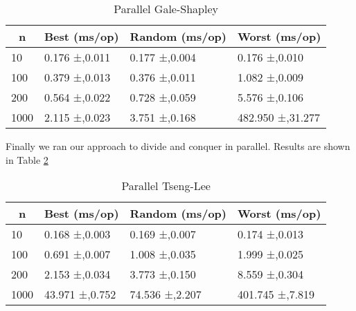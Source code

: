 \begin{table}[h]
    \centering
\begin{tabular}{|l|l|l|l|}
\hline
\multicolumn{1}{|c|}{\textbf{n}} & \multicolumn{1}{c|}{\textbf{Best (ms/op)}} & \multicolumn{1}{c|}{\textbf{Random (ms/op)}} & \multicolumn{1}{c|}{\textbf{Worst (ms/op)}} \\ \hline
10                               & 0.176 ±,0.011                              & 0.177 ±,0.004                                & 0.176 ±,0.010                               \\ \hline
100                              & 0.379 ±,0.013                              & 0.376 ±,0.011                                & 1.082 ±,0.009                               \\ \hline
200                              & 0.564 ±,0.022                              & 0.728 ±,0.059                                & 5.576 ±,0.106                               \\ \hline
1000                             & 2.115 ±,0.023                              & 3.751 ±,0.168                                & 482.950 ±,31.277                            \\ \hline
\end{tabular}
    \caption{Parallel Gale-Shapley}
    \label{tab:parallel-gale-shapley}
\end{table}

Finally we ran our approach to divide and conquer in parallel. Results are shown in Table \ref{tab:parallel-tseng-lee}

\begin{table}[h]
    \centering
\begin{tabular}{|l|l|l|l|}
\hline
\multicolumn{1}{|c|}{\textbf{n}} & \multicolumn{1}{c|}{\textbf{Best (ms/op)}} & \multicolumn{1}{c|}{\textbf{Random (ms/op)}} & \multicolumn{1}{c|}{\textbf{Worst (ms/op)}} \\ \hline
10                               & 0.168 ±,0.003                              & 0.169 ±,0.007                                & 0.174 ±,0.013                               \\ \hline
100                              & 0.691 ±,0.007                              & 1.008 ±,0.035                                & 1.999 ±,0.025                               \\ \hline
200                              & 2.153 ±,0.034                              & 3.773 ±,0.150                                & 8.559 ±,0.304                               \\ \hline
1000                             & 43.971 ±,0.752                             & 74.536 ±,2.207                               & 401.745 ±,7.819                             \\ \hline
\end{tabular}
    \caption{Parallel Tseng-Lee}
    \label{tab:parallel-tseng-lee}
\end{table}